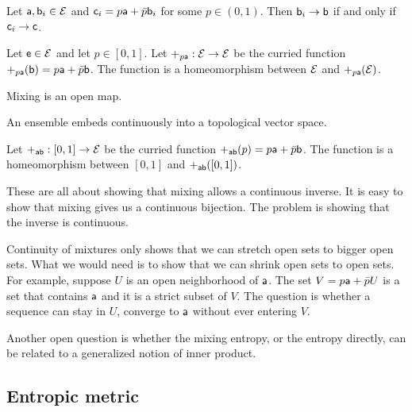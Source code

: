 \begin{conj}
	Let $\ens[a], \ens[b]_i\in \Ens$ and $\ens[c]_i = p \ens[a] +\bar{p} \ens[b]_i$ for some $p \in (0,1)$. Then $\ens[b]_i \to \ens[b]$ if and only if $\ens[c]_i \to \ens[c]$. 
\end{conj}

\begin{conj}
	Let $\ens \in \Ens$ and let $p \in [0,1]$. Let $+_{p\ens[a]} : \Ens \to \Ens$ be the curried function $+_{p\ens[a]}(\ens[b]) = p\ens[a] + \bar{p}\ens[b]$. The function is a homeomorphism between $\Ens$ and $+_{p\ens[a]}(\Ens)$.
\end{conj}

\begin{conj}
	Mixing is an open map.
\end{conj}

\begin{conj}
	An ensemble embeds continuously into a topological vector space.
\end{conj}

\begin{conj}
	Let $+_{\ens[a]\ens[b]} : [0,1] \to \Ens$ be the curried function $+_{\ens[a]\ens[b]}(p) = p\ens[a] + \bar{p}\ens[b]$. The function is a homeomorphism between $[0,1]$ and $+_{\ens[a]\ens[b]}([0,1])$.
\end{conj}

\begin{remark}
	These are all about showing that mixing allows a continuous inverse. It is easy to show that mixing gives us a continuous bijection. The problem is showing that the inverse is continuous.
	
	Continuity of mixtures only shows that we can stretch open sets to bigger open sets. What we would need is to show that we can shrink open sets to open sets. For example, suppose $U$ is an open neighborhood of $\ens[a]$. The set $V = p \ens[a] + \bar{p} U$ is a set that contains $\ens[a]$ and it is a strict subset of $V$. The question is whether a sequence can stay in $U$, converge to $\ens[a]$ without ever entering $V$.
\end{remark}

Another open question is whether the mixing entropy, or the entropy directly, can be related to a generalized notion of inner product.

\subsection{Entropic metric}

